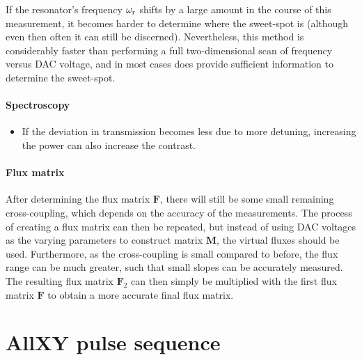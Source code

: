        If the resonator's frequency $\omega_\text{r}$ shifts by a large amount in the course of this measurement, it becomes harder to determine where the sweet-spot is (although even then often it can still be discerned). Nevertheless, this method is considerably faster than performing a full two-dimensional scan of frequency versus DAC voltage, and in most cases does provide sufficient information to determine the sweet-spot.


      \subsubsection{Spectroscopy}
        \begin{itemize}
          \item If the deviation in transmission becomes less due to more detuning, increasing the power can also increase the contrast.
        \end{itemize}
      \subsubsection{Flux matrix}
        After determining the flux matrix $\boldsymbol{F}$, there will still be some small remaining cross-coupling, which depends on the accuracy of the measurements. The process of creating a flux matrix can then be repeated, but instead of using DAC voltages as the varying parameters to construct matrix $\boldsymbol{M}$, the virtual fluxes should be used. Furthermore, as the cross-coupling is small compared to before, the flux range can be much greater, such that small slopes can be accurately measured. The resulting flux matrix $\boldsymbol{F}_2$ can then simply be multiplied with the first flux matrix $\boldsymbol{F}$ to obtain a more accurate final flux matrix.
    \chapter{AllXY pulse sequence}
      \label{ch:AllXY pulse table}

